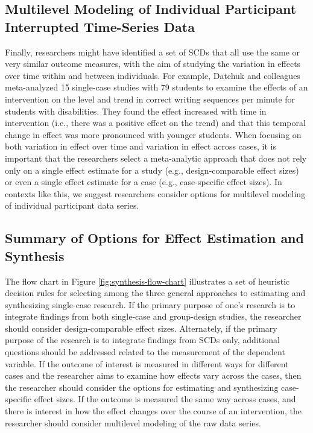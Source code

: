 \documentclass[
]{book}
\begin{document}
\hypertarget{multilevel-modeling-of-individual-participant-interrupted-time-series-data}{%
\subsection{Multilevel Modeling of Individual Participant Interrupted Time-Series Data}\label{multilevel-modeling-of-individual-participant-interrupted-time-series-data}}

Finally, researchers might have identified a set of SCDs that all use the same or very similar outcome measures, with the aim of studying the variation in effects over time within and between individuals.
For example, Datchuk and colleagues \citep{datchuk2020Level} meta-analyzed 15 single-case studies with 79 students to examine the effects of an intervention on the level and trend in correct writing sequences per minute for students with disabilities.
They found the effect increased with time in intervention (i.e., there was a positive effect on the trend) and that this temporal change in effect was more pronounced with younger students.
When focusing on both variation in effect over time and variation in effect across cases, it is important that the researchers select a meta-analytic approach that does not rely only on a single effect estimate for a study (e.g., design-comparable effect sizes) or even a single effect estimate for a case (e.g., case-specific effect sizes).
In contexts like this, we suggest researchers consider options for multilevel modeling of individual participant data series.

\hypertarget{summary-of-options-for-effect-estimation-and-synthesis}{%
\subsection{Summary of Options for Effect Estimation and Synthesis}\label{summary-of-options-for-effect-estimation-and-synthesis}}

The flow chart in Figure \ref{fig:synthesis-flow-chart} illustrates a set of heuristic decision rules for selecting among the three general approaches to estimating and synthesizing single-case research.
If the primary purpose of one's research is to integrate findings from both single-case and group-design studies, the researcher should consider design-comparable effect sizes.
Alternately, if the primary purpose of the research is to integrate findings from SCDs only, additional questions should be addressed related to the measurement of the dependent variable.
If the outcome of interest is measured in different ways for different cases and the researcher aims to examine how effects vary across the cases, then the researcher should consider the options for estimating and synthesizing case-specific effect sizes.
If the outcome is measured the same way across cases, and there is interest in how the effect changes over the course of an intervention, the researcher should consider multilevel modeling of the raw data series.
\end{document}
